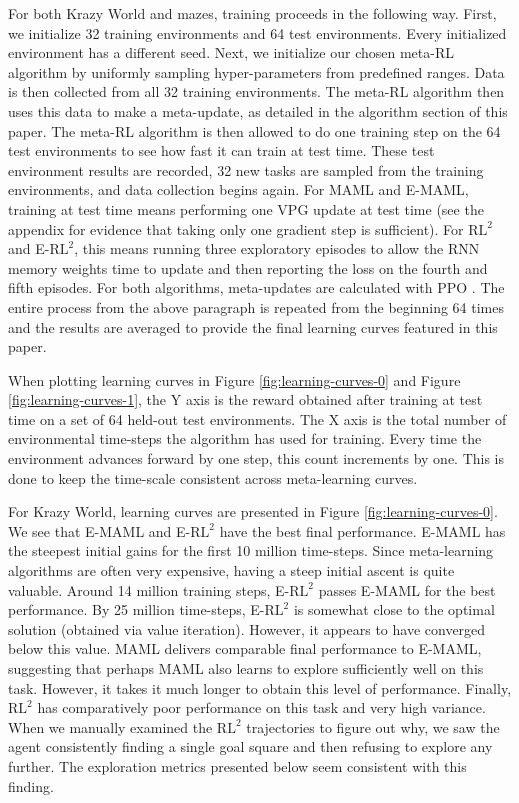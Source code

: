 \documentclass{article} %
\begin{document}

For both Krazy World and mazes, training proceeds in the following way. First, we initialize 32 training environments and 64 test environments. Every initialized environment has a different seed. Next, we initialize our chosen meta-RL algorithm by uniformly sampling hyper-parameters from predefined ranges. Data is then collected from all 32 training environments. The meta-RL algorithm then uses this data to make a meta-update, as detailed in the algorithm section of this paper. The meta-RL algorithm is then allowed to do one training step on the 64 test environments to see how fast it can train at test time. These test environment results are recorded, 32 new tasks are sampled from the training environments, and data collection begins again. For MAML and E-MAML, training at test time means performing one VPG update at test time (see the appendix for evidence that taking only one gradient step is sufficient). For $\text{RL}^2$ and E-$\text{RL}^2$, this means running three exploratory episodes to allow the RNN memory weights time to update and then reporting the loss on the fourth and fifth episodes. For both algorithms, meta-updates are calculated with PPO \cite{ppo}. The entire process from the above paragraph is repeated from the beginning 64 times and the results are averaged to provide the final learning curves featured in this paper. 

When plotting learning curves in Figure  \ref{fig:learning-curves-0} and Figure \ref{fig:learning-curves-1}, the Y axis is the reward obtained after training at test time on a set of 64 held-out test environments. The X axis is the total number of environmental time-steps the algorithm has used for training. Every time the environment advances forward by one step, this count increments by one. This is done to keep the time-scale consistent across meta-learning curves.  

For Krazy World, learning curves are presented in Figure \ref{fig:learning-curves-0}. We see that E-MAML and E-$\text{RL}^2$ have the best final performance. E-MAML has the steepest initial gains for the first 10 million time-steps. Since meta-learning algorithms are often very expensive, having a steep initial ascent is quite valuable. Around 14 million training steps, E-$\text{RL}^2$ passes E-MAML for the best performance. By 25 million time-steps, E-$\text{RL}^2$ is somewhat close to the optimal solution (obtained via value iteration). However, it appears to have converged below this value. MAML delivers comparable final performance to E-MAML, suggesting that perhaps MAML also learns to explore sufficiently well on this task. However, it takes it much longer to obtain this level of performance. Finally, $\text{RL}^2$ has comparatively poor performance on this task and very high variance. When we manually examined the $\text{RL}^2$ trajectories to figure out why, we saw the agent consistently finding a single goal square and then refusing to explore any further. The exploration metrics presented below seem consistent with this finding. 
\end{document}
